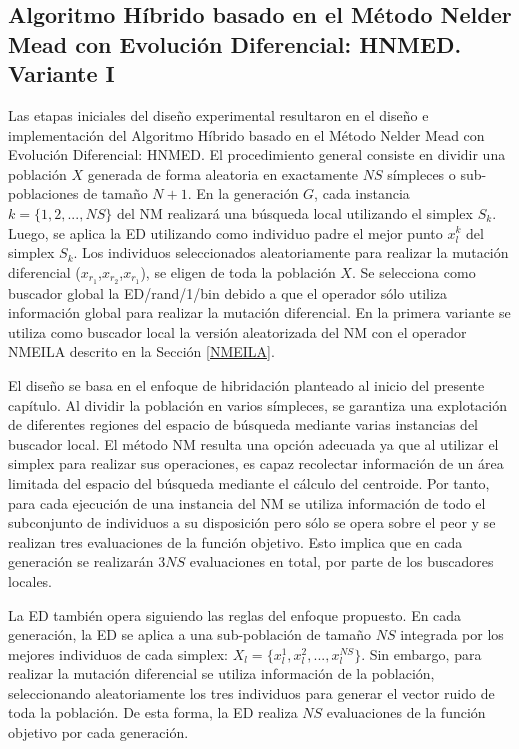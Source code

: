 
\subsection{Algoritmo Híbrido basado en el Método Nelder Mead con Evolución Diferencial: HNMED. Variante I}\label{sec:HNMEDV1}
Las etapas iniciales del diseño experimental resultaron en el diseño e implementación del Algoritmo Híbrido basado en el Método Nelder  Mead con Evolución Diferencial: HNMED. El procedimiento general  consiste en dividir una población $X$ generada de forma aleatoria en exactamente $NS$ símpleces o sub-poblaciones de tamaño $N+1$. En la generación $G$, cada instancia $k=\{1,2,...,NS\}$ del NM realizará una búsqueda local utilizando el simplex $S_k$. Luego, se aplica la ED utilizando como individuo padre el mejor punto $x^k_l$ del simplex $S_k$. Los individuos seleccionados aleatoriamente para realizar la mutación diferencial ($x_{r_1}$,$x_{r_2}$,$x_{r_1}$), se eligen de toda la población $X$. Se selecciona como buscador global la ED/rand/1/bin debido a que el operador sólo utiliza información global para realizar la mutación diferencial. En la primera variante se utiliza como buscador local la versión aleatorizada del NM con el operador NMEILA descrito en la Sección \ref{NMEILA}.

El diseño se basa en el enfoque de hibridación planteado al inicio del presente capítulo. Al dividir la población en varios símpleces, se garantiza una explotación de diferentes regiones del espacio de búsqueda mediante varias instancias del buscador local. El método NM resulta una opción adecuada ya que al utilizar el simplex para realizar sus operaciones, es capaz recolectar información de un área limitada del espacio del búsqueda mediante el cálculo del centroide. Por tanto, para cada ejecución de una instancia del NM se utiliza información de todo el subconjunto de individuos a su disposición pero sólo se opera sobre el peor y se realizan tres evaluaciones de la función objetivo. Esto implica que en cada generación se realizarán $3NS$ evaluaciones en total, por parte de los buscadores locales.

La ED también opera siguiendo las reglas del enfoque propuesto. En cada generación, la ED se aplica a una sub-población de tamaño $NS$ integrada por los mejores individuos de cada simplex: $X_l=\{x^1_l,x^2_l,...,x^{NS}_l \}$. Sin embargo, para realizar la mutación diferencial se utiliza información de la población, seleccionando aleatoriamente los tres individuos para generar el vector ruido  de toda la población. De esta forma, la ED realiza $NS$ evaluaciones de la función objetivo por cada generación. 

